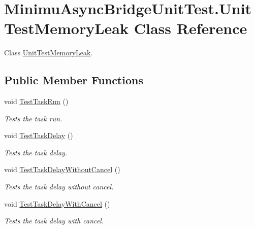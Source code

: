 \hypertarget{class_minimu_async_bridge_unit_test_1_1_unit_test_memory_leak}{}\section{Minimu\+Async\+Bridge\+Unit\+Test.\+Unit\+Test\+Memory\+Leak Class Reference}
\label{class_minimu_async_bridge_unit_test_1_1_unit_test_memory_leak}


Class \hyperlink{class_minimu_async_bridge_unit_test_1_1_unit_test_memory_leak}{Unit\+Test\+Memory\+Leak}.  


\subsection*{Public Member Functions}
\begin{DoxyCompactItemize}
\item 
void \hyperlink{class_minimu_async_bridge_unit_test_1_1_unit_test_memory_leak_ac2a68ecb4ea205c9a4c274bc5971440c}{Test\+Task\+Run} ()
\begin{DoxyCompactList}\small\item\em Tests the task run. \end{DoxyCompactList}\item 
void \hyperlink{class_minimu_async_bridge_unit_test_1_1_unit_test_memory_leak_ae135c6b4ce6f7ba3fd4f5db8cd9e4cd3}{Test\+Task\+Delay} ()
\begin{DoxyCompactList}\small\item\em Tests the task delay. \end{DoxyCompactList}\item 
void \hyperlink{class_minimu_async_bridge_unit_test_1_1_unit_test_memory_leak_a2cabda37a17fdf4086a39859ff5a2a52}{Test\+Task\+Delay\+Without\+Cancel} ()
\begin{DoxyCompactList}\small\item\em Tests the task delay without cancel. \end{DoxyCompactList}\item 
void \hyperlink{class_minimu_async_bridge_unit_test_1_1_unit_test_memory_leak_a080f60536f8957defa29d3e1371e10d5}{Test\+Task\+Delay\+With\+Cancel} ()
\begin{DoxyCompactList}\small\item\em Tests the task delay with cancel. \end{DoxyCompactList}\end{DoxyCompactItemize}


